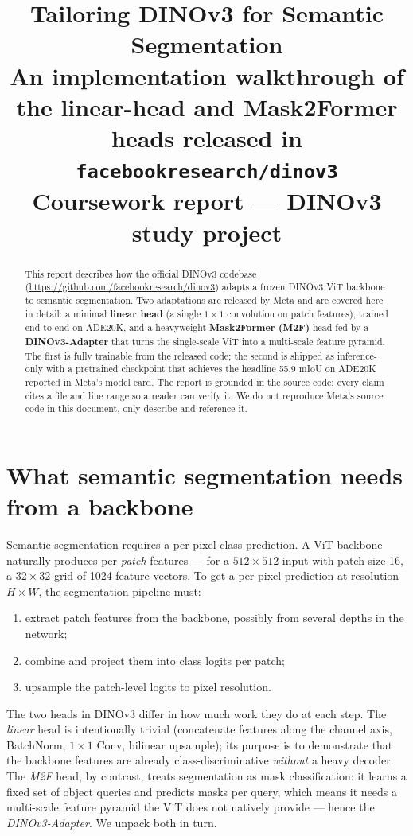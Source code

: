 \documentclass[11pt,a4paper]{article}
\title{\textbf{Tailoring DINOv3 for Semantic Segmentation}\\[0.4em]
\large An implementation walkthrough of the linear-head and Mask2Former heads
released in \texttt{facebookresearch/dinov3}\\[0.6em]
\small Coursework report --- DINOv3 study project}
\author{}
\date{}
\begin{document}
\maketitle

\begin{abstract}
\noindent
This report describes how the official DINOv3 codebase
(\url{https://github.com/facebookresearch/dinov3}) adapts a frozen DINOv3
ViT backbone to semantic segmentation. Two adaptations are released by Meta
and are covered here in detail: a minimal \textbf{linear head}
(a single $1{\times}1$ convolution on patch features), trained end-to-end on
ADE20K, and a heavyweight \textbf{Mask2Former (M2F)} head fed by a
\textbf{DINOv3-Adapter} that turns the single-scale ViT into a multi-scale
feature pyramid. The first is fully trainable from the released code; the
second is shipped as inference-only with a pretrained checkpoint that
achieves the headline 55.9 mIoU on ADE20K reported in Meta's model card. The
report is grounded in the source code: every claim cites a file and line
range so a reader can verify it. We do not reproduce Meta's source code in
this document, only describe and reference it.
\end{abstract}

\tableofcontents
\newpage

\section{What semantic segmentation needs from a backbone}

Semantic segmentation requires a per-pixel class prediction. A ViT backbone
naturally produces per-\emph{patch} features --- for a $512{\times}512$ input
with patch size 16, a $32{\times}32$ grid of 1024 feature vectors. To get a
per-pixel prediction at resolution $H{\times}W$, the segmentation pipeline
must:
\begin{enumerate}[leftmargin=1.6em,itemsep=0pt]
  \item extract patch features from the backbone, possibly from several
        depths in the network;
  \item combine and project them into class logits per patch;
  \item upsample the patch-level logits to pixel resolution.
\end{enumerate}
The two heads in DINOv3 differ in how much work they do at each step.
The \emph{linear} head is intentionally trivial (concatenate features along
the channel axis, BatchNorm, $1{\times}1$ Conv, bilinear upsample); its
purpose is to demonstrate that the backbone features are already
class-discriminative \emph{without} a heavy decoder. The \emph{M2F} head, by
contrast, treats segmentation as mask classification: it learns a fixed set
of object queries and predicts masks per query, which means it needs a
multi-scale feature pyramid the ViT does not natively provide --- hence the
\emph{DINOv3-Adapter}. We unpack both in turn.
\end{document}
